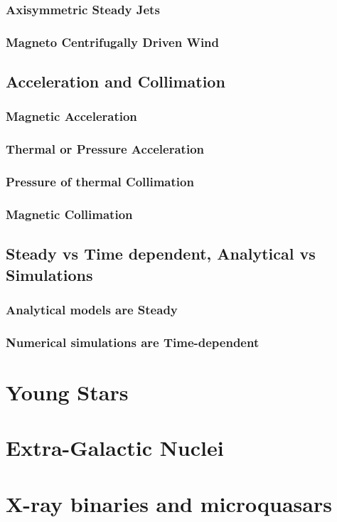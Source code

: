 \documentclass[10pt,a4paper,english,draft]{article}
\begin{document}
\subsubsection{Axisymmetric Steady Jets}
\subsubsection{Magneto Centrifugally Driven Wind}
\subsection{Acceleration and Collimation}
\subsubsection{Magnetic Acceleration}
\subsubsection{Thermal or Pressure Acceleration}
\subsubsection{Pressure of thermal Collimation}
\subsubsection{Magnetic Collimation}
\subsection{Steady vs Time dependent, Analytical vs Simulations}
\subsubsection{Analytical models are Steady}
\subsubsection{Numerical simulations are Time-dependent}

\section{Young Stars}
\section{Extra-Galactic Nuclei}
\section{X-ray binaries and microquasars}

\appendix

\makeatletter
\def\@seccntformat#1{Appendix~\csname the#1\endcsname:\quad}
\makeatother

\newpage




\listoffixmes
\end{document}
